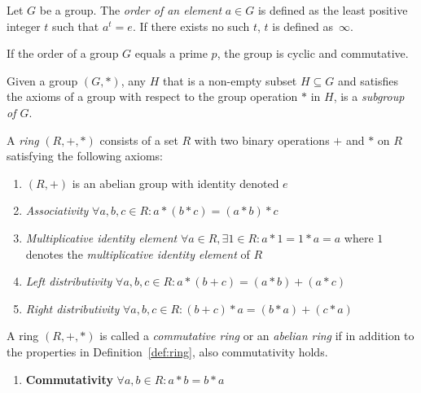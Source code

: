 \begin{defn}
\label{def:order_of_an_element}
Let $G$ be a group. The \textit{order of an element} $a \in G$ is defined as the least positive integer $t$ such that $a^t = e$. If there exists no such $t$, $t$ is defined as~$\infty$.
\end{defn}

\begin{thm}
\label{the:group_modulo_a_prime}
If the order of a group $G$ equals a prime $p$, the group is cyclic and commutative.
\end{thm}

\begin{defn}[Subgroup]
\label{def:subgroup}
 Given a group $\left( G, * \right)$, any $H$ that is a non-empty subset $H \subseteq G$ and satisfies the axioms of a group with respect to the group operation $*$ in $H$, is a \textit{subgroup of $G$}.
\end{defn}

\begin{defn}[Ring]
\label{def:ring}
  \setcounter{enumTemp}{\theenumi}
 A \textit{ring} $\left( R, +, * \right)$ consists of a set $R$ with two binary operations $+$ and $*$ on $R$ satisfying the following axioms:
 \begin{enumerate}
  \item $\left( R, + \right)$ is an abelian group with identity denoted $e$
  \item \textit{Associativity} $\forall a, b, c \in R: a*(b*c) = (a*b)*c$
  \item \textit{Multiplicative identity element} $\forall a \in R, \exists 1 \in R: a*1 = 1*a = a $ where $1$ denotes the \textit{multiplicative identity element} of $R$
  \item \textit{Left distributivity} $\forall a, b, c \in R: a*\left( b + c \right) = \left( a * b \right) + \left( a * c \right)$
  \item \textit{Right distributivity} $\forall a, b, c \in R: \left( b + c \right) * a = \left( b * a \right) + \left( c * a \right)$
   \setcounter{enumTemp}{\theenumi}
 \end{enumerate}
\end{defn}

\begin{defn}
 \label{def:commutative_ring}
 A ring $\left( R, +, * \right)$ is called a \textit{commutative ring} or an \textit{abelian ring} if in addition to the properties in Definition~\ref{def:ring}, also commutativity holds.
 \begin{enumerate}
  \setcounter{enumi}{\theenumTemp}
  \item \textbf{Commutativity} $\forall a, b \in R: a*b = b*a$
  \setcounter{enumTemp}{\theenumi}
 \end{enumerate}

\end{defn}

